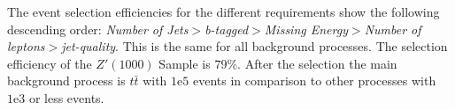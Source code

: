 The event selection efficiencies for the different requirements show the following descending order: \emph{Number of Jets}$>$\emph{b-tagged}$>$\emph{Missing Energy}$>$\emph{Number of leptons}$>$\emph{jet-quality}. This is the same for all background processes. The selection efficiency of the $Z'(1000)$ Sample is $79\%$. After the selection the main background process is $t\bar t$ with $1\mathrm{e}{5}$ events in comparison to other processes with $1\mathrm{e}3$ or less events.
	


